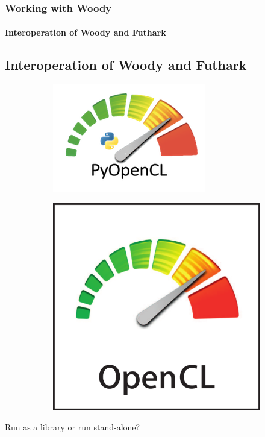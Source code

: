 \documentclass[12pt,t]{beamer}
\begin{document}
\begin{frame}
  \frametitle{Working with Woody}
  \framesubtitle{Interoperation of Woody and Futhark}
\subsection{Interoperation of Woody and Futhark}

\begin{figure}
\centering
\begin{subfigure}{.5\textwidth}
  \centering
  \includegraphics[width=.5\linewidth]{opencl_logo}
  \label{fig:pyopencl}
\end{subfigure}%
\begin{subfigure}{.5\textwidth}
  \centering
  \includegraphics[width=.5\linewidth]{opencl}
  \label{fig:opencl}
\end{subfigure}
\label{fig:test}
\end{figure}

Run as a library or run stand-alone?


\end{frame}
\end{document}

